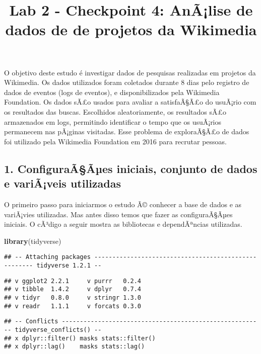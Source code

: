 \documentclass[]{article}
\title{Lab 2 - Checkpoint 4: AnÃ¡lise de dados de de projetos da Wikimedia}
\author{}
\date{}
\newenvironment{Shaded}{\begin{snugshade}}{\end{snugshade}}
\newcommand{\KeywordTok}[1]{\textcolor[rgb]{0.13,0.29,0.53}{\textbf{#1}}}
\newcommand{\NormalTok}[1]{#1}
\begin{document}
\maketitle

O objetivo deste estudo é investigar dados de pesquisas realizadas em
projetos da Wikimedia. Os dados utilizados foram coletados durante 8
dias pelo registro de dados de eventos (logs de eventos), e
disponibilizados pela Wikimedia Foundation. Os dados sÃ£o usados para
avaliar a satisfaÃ§Ã£o do usuÃ¡rio com os resultados das buscas.
Escolhidos aleatoriamente, os resultados sÃ£o armazenados em logs,
permitindo identificar o tempo que os usuÃ¡rios permanecem nas pÃ¡ginas
visitadas. Esse problema de exploraÃ§Ã£o de dados foi utilizado pela
Wikimedia Foundation em 2016 para recrutar pessoas.

\subsection{1. ConfiguraÃ§Ãµes iniciais, conjunto de dados e variÃ¡veis
utilizadas}\label{configuraaaes-iniciais-conjunto-de-dados-e-variaveis-utilizadas}

O primeiro passo para iniciarmos o estudo Ã© conhecer a base de dados e
as variÃ¡vies utilizadas. Mas antes disso temos que fazer as
configuraÃ§Ãµes iniciais. O cÃ³digo a seguir mostra as bibliotecas e
dependÃªncias utilizadas.

\begin{Shaded}
\begin{Highlighting}[]
\KeywordTok{library}\NormalTok{(tidyverse)}
\end{Highlighting}
\end{Shaded}

\begin{verbatim}
## -- Attaching packages ----------------------------------------------------- tidyverse 1.2.1 --
\end{verbatim}

\begin{verbatim}
## v ggplot2 2.2.1     v purrr   0.2.4
## v tibble  1.4.2     v dplyr   0.7.4
## v tidyr   0.8.0     v stringr 1.3.0
## v readr   1.1.1     v forcats 0.3.0
\end{verbatim}

\begin{verbatim}
## -- Conflicts -------------------------------------------------------- tidyverse_conflicts() --
## x dplyr::filter() masks stats::filter()
## x dplyr::lag()    masks stats::lag()
\end{verbatim}
\end{document}

